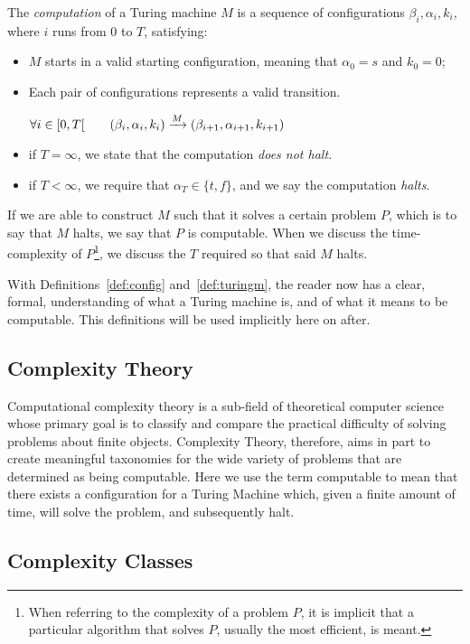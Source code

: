 \documentclass[11pt,letterpaper]{article}
\theoremstyle{definition}
\begin{document}
The \emph{computation} of a Turing machine \(M \) is a sequence of configurations \(\beta_i, \alpha_i, k_i \), where \(i \) runs from \(0 \) to \(T \), satisfying:
\begin{itemize}
    \item \(M \) starts in a valid starting configuration, meaning that \(\alpha_0 = s \) and \(k_0 = 0 \);
    \item Each pair of configurations represents a valid transition.

        \(\forall i\in\interval[open right]{0}{T}\qquad(\beta_i, \alpha_i, k_i)\xrightarrow{M}(\beta_{i+1}, \alpha_{i+1}, k_{i+1}) \)

    \item if \(T = \infty \), we state that the computation \emph{does not halt.}
    \item if \(T < \infty \), we require that \(\alpha_T \in \{t, f\} \), and we say the computation \emph{halts}.
\end{itemize}

If we are able to construct \(M\) such that it solves a certain problem \(P\), which is to say that \(M\) halts, we say that \(P\) is computable. When we discuss the time-complexity of \(P\)\footnote{When referring to the complexity of a problem \(P\), it is implicit that a particular algorithm that solves \(P\), usually the most efficient, is meant.}, we discuss the \(T\) required so that said \(M\) halts.

With Definitions~\ref{def:config} and~\ref{def:turingm}, the reader now has a clear, formal, understanding of what a Turing machine is, and of what it means to be computable. This definitions will be used implicitly here on after.

\subsection{Complexity Theory}
Computational complexity theory is a sub-field of theoretical computer science whose primary goal is to classify and compare the practical difficulty of solving problems about finite objects.\autocite{sep-computational-complexity} Complexity Theory, therefore, aims in part to create meaningful taxonomies for the wide variety of problems that are determined as being computable. Here we use the term computable to mean that there exists a configuration for a Turing Machine which, given a finite amount of time, will solve the problem, and subsequently halt.

\subsection{Complexity Classes}
\end{document}
